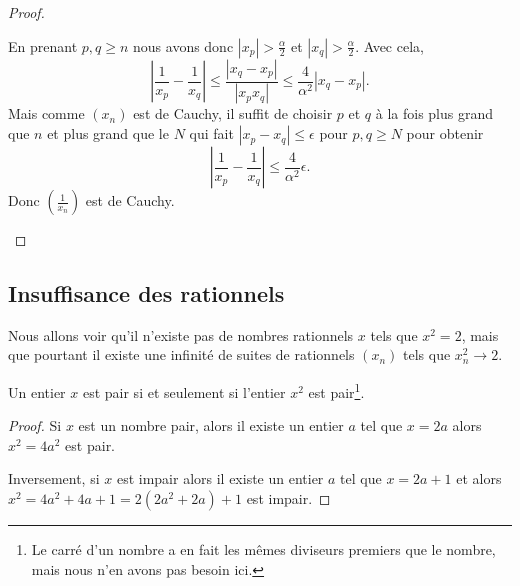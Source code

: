 \begin{proof}
\begin{enumerate}
            En prenant \( p,q\geq n\) nous avons donc \( |  x_p|>\frac{ \alpha }{2}\) et \( | x_q |>\frac{ \alpha }{2}\). Avec cela,
            \begin{equation}
                \left| \frac{1}{ x_p }-\frac{1}{ x_q } \right| \leq \frac{ | x_q-x_p | }{ | x_px_q | }\leq \frac{ 4 }{ \alpha^2 }| x_q-x_p |.
            \end{equation}
            Mais comme \( (x_n)\) est de Cauchy, il suffit de choisir \( p\) et \( q\) à la fois plus grand que \( n\) et plus grand que le \( N\) qui fait \( | x_p-x_q |\leq \epsilon\) pour \( p,q\geq N\) pour obtenir
            \begin{equation}
                \left| \frac{1}{ x_p }-\frac{1}{ x_q } \right| \leq \frac{ 4 }{ \alpha^2 }\epsilon.
            \end{equation}
            Donc \( \left( \frac{1}{ x_n } \right)\) est de Cauchy.
    \end{enumerate}
\end{proof}

\subsection{Insuffisance des rationnels}

Nous allons voir qu'il n'existe pas de nombres rationnels \( x\) tels que \( x^2=2\), mais que pourtant il existe une infinité de suites de rationnels \( (x_n)\) tels que \(  x_n^2\to 2  \).

\begin{lemma}       \label{LemJPIUooWFHaFM}
    Un entier \( x\) est pair si et seulement si l'entier \( x^2\) est pair\footnote{Le carré d'un nombre a en fait les mêmes diviseurs premiers que le nombre, mais nous n'en avons pas besoin ici.}.
\end{lemma}

\begin{proof}
    Si \( x\) est un nombre pair, alors il existe un entier \( a\) tel que \( x=2a\) alors \( x^2=4a^2\) est pair.

    Inversement, si \( x\) est impair alors il existe un entier \( a\) tel que \( x=2a+1\) et alors \( x^2=4a^2+4a+1=2(2a^2+2a)+1\) est impair.
\end{proof}

